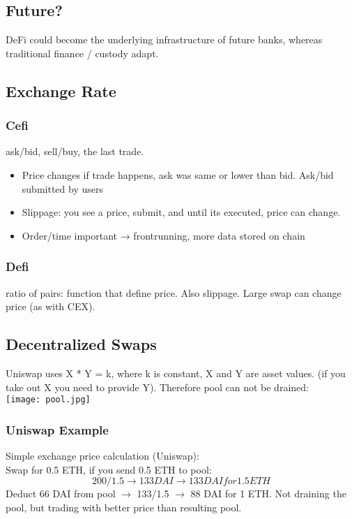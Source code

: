 \subsection{Future?}
DeFi could become the underlying infrastructure of future banks, whereas traditional finance / custody adapt.

\subsection{Exchange Rate}

\subsubsection{Cefi}
ask/bid, sell/buy, the last trade.
\begin{itemize}
  \item Price changes if trade happens, ask was same or lower than bid. Ask/bid submitted by users
  \item Slippage: you see a price, submit, and until its executed, price can change.
  \item Order/time important → frontrunning, more data stored on chain
\end{itemize}

\subsubsection{Defi}
ratio of pairs: function that define price.
Also slippage. 
Large swap can change price (as with CEX).

\subsection{Decentralized Swaps}
Uniswap uses X * Y = k, where k is constant, X and Y are asset values.
(if you take out X you need to provide Y).
Therefore pool can not be drained:\\
\texttt{[image: pool.jpg]}

\subsubsection{Uniswap Example}
Simple exchange price calculation (Uniswap):\\
Swap for 0.5 ETH, if you send 0.5 ETH to pool:
$$200 / 1.5 \rightarrow 133 DAI \rightarrow 133 DAI for 1.5 ETH$$
Deduct 66 DAI from pool $\rightarrow$ 133/1.5 $\rightarrow$ 88 DAI for 1 ETH.
Not draining the pool, but trading with better price than resulting pool.